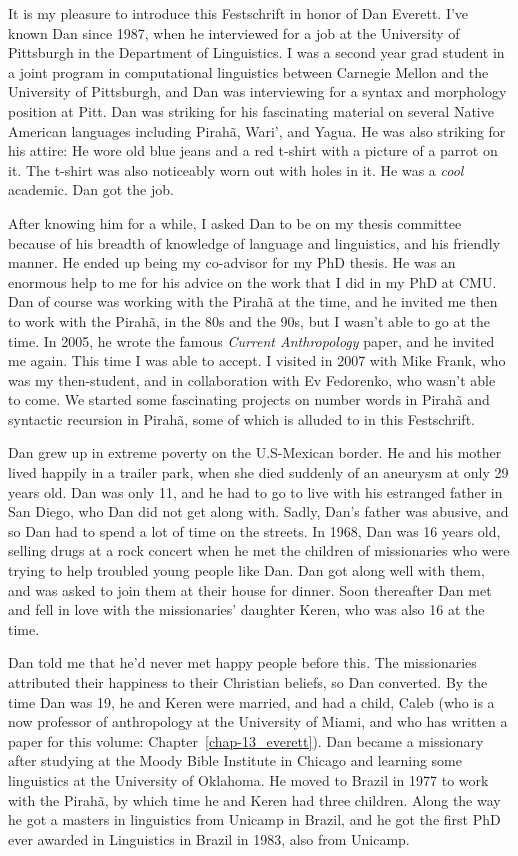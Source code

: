\begin{refsection}

It is my pleasure to introduce this Festschrift in honor of Dan Everett. I've known Dan since 1987, when he interviewed for a job at the University of Pittsburgh in the Department of Linguistics. I was a second year grad student in a joint program in computational linguistics between Carnegie Mellon and the University of Pittsburgh, and Dan was interviewing for a syntax and morphology position at Pitt. Dan was striking for his fascinating material on several Native American languages including Pirahã, Wari', and Yagua. He was also striking for his attire: He wore old blue jeans and a red t-shirt with a picture of a parrot on it.  The t-shirt was also noticeably worn out with holes in it. He was a \textit{cool} academic. Dan got the job. 

After knowing him for a while, I asked Dan to be on my thesis committee because of his breadth of knowledge of language and linguistics, and his friendly manner. He ended up being my co-advisor for my PhD thesis. He was an enormous help to me for his advice on the work that I did in my PhD at CMU. Dan of course was working with the Pirahã at the time, and he invited me then to work with the Pirahã, in the 80s and the 90s, but I wasn't able to go at the time. In 2005, he wrote the famous \textit{Current Anthropology} paper, and he invited me again. This time I was able to accept. I visited in 2007 with Mike Frank, who was my then-student, and in collaboration with Ev Fedorenko, who wasn't able to come. We started some fascinating projects on number words in Pirahã and syntactic recursion in Pirahã, some of which is alluded to in this Festschrift. 

Dan grew up in extreme poverty on the U.S-Mexican border. He and his mother lived happily in a trailer park, when she died suddenly of an aneurysm at only 29 years old. Dan was only 11, and he had to go to live with his estranged father in San Diego, who Dan did not get along with. Sadly, Dan's father was abusive, and so Dan had to spend a lot of time on the streets. In 1968, Dan was 16 years old, selling drugs at a rock concert when he met the children of missionaries who were trying to help troubled young people like Dan. Dan got along well with them, and was asked to join them at their house for dinner. Soon thereafter Dan met and fell in love with the missionaries' daughter Keren, who was also 16 at the time.

Dan told me that he'd never met happy people before this. The missionaries attributed their happiness to their Christian beliefs, so Dan converted. By the time Dan was 19, he and Keren were married, and had a child, Caleb (who is a now professor of anthropology at the University of Miami, and who has written a paper for this volume: Chapter~\ref{chap-13_everett}). Dan became a missionary after studying at the Moody Bible Institute in Chicago and learning some linguistics at the University of Oklahoma. He moved to Brazil in 1977 to work with the Pirahã, by which time he and Keren had three children. Along the way he got a masters in linguistics from Unicamp in Brazil, and he got the first PhD ever awarded in Linguistics in Brazil in 1983, also from Unicamp. 


\end{refsection}
